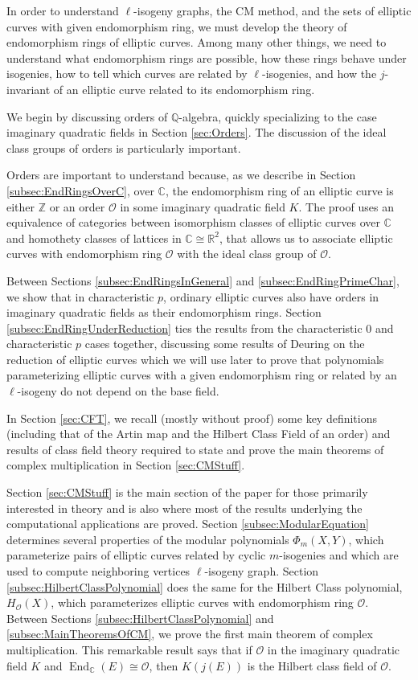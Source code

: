 \documentclass{amsart}
\theoremstyle{definition}
\theoremstyle{remark}
\numberwithin{equation}{section}
\newcommand{\cO}{\mathcal O}
\newcommand{\bbC}{\mathbb C}
\newcommand{\bbQ}{\mathbb Q}
\newcommand{\bbR}{\mathbb R}
\newcommand{\bbZ}{\mathbb Z}
\DeclareMathOperator{\End}{End}
\begin{document}
 In order to understand $\ell$-isogeny graphs, the CM method, and the sets of elliptic curves with given endomorphism ring, we must develop the theory of endomorphism rings of elliptic curves. Among many other things, we need to understand what endomorphism rings are possible, how these rings behave under isogenies, how to tell which curves are related by $\ell$-isogenies, and how the $j$-invariant of an elliptic curve related to its endomorphism ring.
 
 We begin by discussing orders of $\bbQ$-algebra, quickly specializing to the case imaginary quadratic fields in Section \ref{sec:Orders}. The discussion of the ideal class groups of orders is particularly important. 
 
 Orders are important to understand because, as we describe in Section \ref{subsec:EndRingsOverC}, over $\bbC$, the endomorphism ring of an elliptic curve is either $\bbZ$ or an order $\cO$ in some imaginary quadratic field $K$. The proof uses an equivalence of categories between isomorphism classes of elliptic curves over $\bbC$ and homothety classes of lattices in $\bbC \cong \bbR^2$, that allows us to associate elliptic curves with endomorphism ring $\cO$ with the ideal class group of $\cO$.
 
Between Sections \ref{subsec:EndRingsInGeneral} and \ref{subsec:EndRingPrimeChar}, we show that in characteristic $p$, ordinary elliptic curves also have orders in imaginary quadratic fields as their endomorphism rings. Section \ref{subsec:EndRingUnderReduction} ties the results from the characteristic $0$ and characteristic $p$ cases together, discussing some results of Deuring on the reduction of elliptic curves which we will use later to prove that polynomials parameterizing elliptic curves with a given endomorphism ring or related by an $\ell$-isogeny do not depend on the base field. 

In Section \ref{sec:CFT}, we recall (mostly without proof) some key definitions (including that of the Artin map and the Hilbert Class Field of an order) and results of class field theory required to state and prove the main theorems of complex multiplication in Section \ref{sec:CMStuff}.

Section \ref{sec:CMStuff} is the main section of the paper for those primarily interested in theory and is also where most of the results underlying the computational applications are proved. Section \ref{subsec:ModularEquation} determines several properties of the modular polynomials $\Phi_{m}(X,Y)$, which parameterize pairs of elliptic curves related by cyclic $m$-isogenies and which are used to compute neighboring vertices $\ell$-isogeny graph. Section \ref{subsec:HilbertClassPolynomial} does the same for the Hilbert Class polynomial, $H_{\cO}(X)$, which parameterizes elliptic curves with endomorphism ring $\cO$. Between Sections \ref{subsec:HilbertClassPolynomial} and \ref{subsec:MainTheoremsOfCM}, we prove the first main theorem of complex multiplication. This remarkable result says that if $\cO$ in the imaginary quadratic field $K$ and $\End_{\bbC}(E) \cong \cO$, then $K(j(E))$ is the Hilbert class field of $\cO$.
\end{document}
